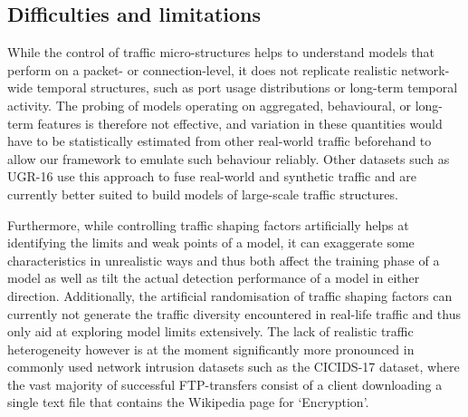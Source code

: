 \documentclass[runningheads]{llncs}
\begin{document}



\subsection{Difficulties and limitations}

While the control of traffic micro-structures helps to understand models that perform on a packet- or connection-level, it does not replicate realistic network-wide temporal structures, such as port usage distributions or long-term temporal activity. The probing of models operating on aggregated, behavioural, or long-term features is therefore not effective, and variation in these quantities would have to be statistically estimated from other real-world traffic beforehand to allow our framework to emulate such behaviour reliably. Other datasets such as UGR-16 use this approach to fuse real-world and synthetic traffic and are currently better suited to build models of large-scale traffic structures.

Furthermore, while controlling traffic shaping factors artificially helps at identifying the limits and weak points of a model, it can exaggerate some characteristics in unrealistic ways and thus both affect the training phase of a model as well as tilt the actual detection performance of a model in either direction. Additionally, the artificial randomisation of traffic shaping factors can currently not generate the traffic diversity encountered in real-life traffic and thus only aid at exploring model limits extensively. The lack of realistic traffic heterogeneity however is at the moment significantly more pronounced in commonly used network intrusion datasets such as the CICIDS-17 dataset, where the vast majority of successful FTP-transfers consist of a client downloading a single text file that contains the Wikipedia page for ‘Encryption’.
\end{document}
